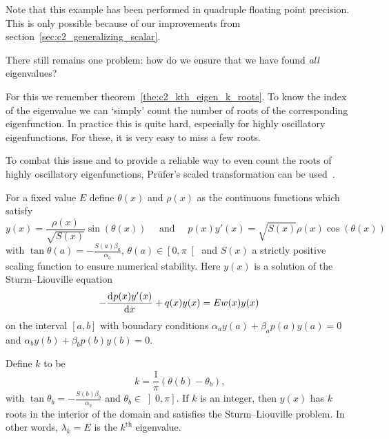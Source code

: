 Note that this example has been performed in quadruple floating point precision. This is only possible because of our improvements from section~\ref{sec:c2_generalizing_scalar}.


There still remains one problem: how do we ensure that we have found \emph{all} eigenvalues?

For this we remember theorem~\ref{the:c2_kth_eigen_k_roots}. To know the index of the eigenvalue we can `simply' count the number of roots of the corresponding eigenfunction. In practice this is quite hard, especially for highly oscillatory eigenfunctions. For these, it is very easy to miss a few roots.

To combat this issue and to provide a reliable way to even count the roots of highly oscillatory eigenfunctions, Prüfer's scaled transformation can be used~\cite{pruefer_neue_1926}.

\begin{theorem}[Prüfer 1926]\label{the:c2_prufer_transformation}
    For a fixed value $E$ define $\theta(x)$ and $\rho(x)$ as the continuous functions which satisfy
    \begin{equation}\label{equ:c2_prufer_theta}
        y(x) = \frac{\rho(x)}{\sqrt{S(x)}} \sin(\theta(x)) \quad\text{ and }\quad p(x)y'(x) = \sqrt{S(x)} \rho(x) \cos(\theta(x))
    \end{equation}
    with $\tan\theta(a) = -\frac{S(a)\beta_a}{\alpha_a}$, $\theta(a) \in \left[0, \pi\right[$ and $S(x)$ a strictly positive scaling function to ensure numerical stability.
                    Here $y(x)$ is a solution of the Sturm--Liouville equation
                    $$
                        -\dv[]{p(x)y'(x)}{x} + q(x) y(x) = E w(x) y(x)
                    $$
                    on the interval $[a, b]$ with boundary conditions $\alpha_a y(a) + \beta_a p(a) y(a) = 0$ and $\alpha_b y(b) + \beta_b p(b) y(b) = 0$.

                    Define $k$ to be
                    $$
                        k = \frac{1}{\pi}\left(\theta(b) - \theta_b\right) \text{,}
                    $$
                    with $\tan\theta_b = -\frac{S(b)\beta_b}{\alpha_b}$ and $\theta_b \in \left]0, \pi\right]$.
    If $k$ is an integer, then $y(x)$ has $k$ roots in the interior of the domain and satisfies the Sturm--Liouville problem. In other words, $\lambda_k = E$ is the $k^\text{th}$ eigenvalue.
\end{theorem}

